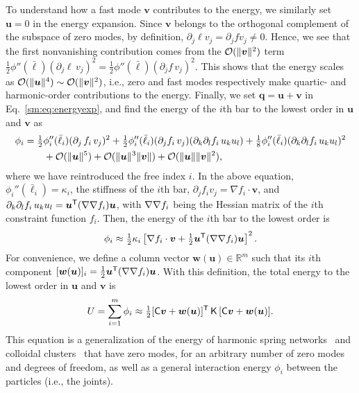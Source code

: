 To understand how a fast mode $\bm{v}$ contributes to the energy, we similarly set $\bm{u} = 0$ in the energy expansion.
Since $\bm{v}$ belongs to the orthogonal complement of the subspace of zero modes, by definition, $\partial_j \ell v_j = \partial_j f v_j \ne 0$.
Hence, we see that the first nonvanishing contribution comes from the $\mathcal{O}(\lVert\bm{v}\rVert^2)$ term $\tfrac{1}{2}\phi''(\bar{\ell})(\partial_j \ell\, v_j)^2 = \tfrac{1}{2}\phi''(\bar{\ell})(\partial_j f\, v_j)^2$.
This shows that the energy scales as $\mathcal{O}(\lVert\bm{u}\rVert^4) \sim \mathcal{O}(\lVert\bm{v}\rVert^2)$, i.e., zero and fast modes respectively make quartic- and harmonic-order contributions to the energy.
Finally, we set $\bm{q} = \bm{u} + \bm{v}$ in Eq.~\eqref{sm:eq:energyexp}, and find the energy of the $i$th bar to the lowest order in $\bm{u}$ and $\bm{v}$ as
%
\begin{equation}
  \begin{aligned}
    \phi_i &= \tfrac{1}{2}\phi_i''(\bar{\ell}_i)(\partial_j\, f_i\, v_j)^2 + \tfrac{1}{2}\phi''_i(\bar{\ell}_i)(\partial_j f_i\, v_j)(\partial_k \partial_l f_i\, u_k u_l) + \tfrac{1}{8}\phi''_i(\bar{\ell}_i)(\partial_k \partial_l f_i\, u_k u_l)^2\\
           &\qquad+ \mathcal{O}(\lVert\bm{u}\rVert^5) + \mathcal{O}(\lVert\bm{u}\rVert^{3}\lVert\bm{v}\rVert) +\mathcal{O}(\lVert\bm{u}\rVert\lVert\bm{v}\rVert^{2}),
  \end{aligned}
\end{equation}
%
where we have reintroduced the free index $i$.
In the above equation, $\phi_{i}''(\bar{\ell}_i) = \kappa_i$, the stiffness of the $i$th bar, $\partial_j f_i v_j = \nabla f_i\cdot\bm{v}$, and $\partial_k\partial_l f_i\, u_k u_l = \bm{u}^\mathsf{T}(\nabla\nabla f_i)\bm{u}$, with $\nabla\nabla f_i$ being the Hessian matrix of the $i$th constraint function $f_i$.
Then, the energy of the $i$th bar to the lowest order is
%
\begin{equation}
  \phi_i \approx \tfrac{1}{2}\kappa_i \left[\nabla f_i\cdot\bm{v} + \tfrac{1}{2}\bm{u}^\mathsf{T}(\nabla\nabla f_i)\bm{u}\right]^2.
\end{equation}
%
For convenience, we define a column vector $\bm{w}(\bm{u}) \in \mathbb{R}^{m}$ such that its $i$th component $[\bm{w}(\bm{u})]_{i} = \tfrac{1}{2}\bm{u}^\mathsf{T}(\nabla\nabla f_{i})\bm{u}$.
With this definition, the total energy to the lowest order in $\bm{u}$ and $\bm{v}$ is
%
\begin{equation}
  U = \sum_{i=1}^m \phi_i \approx \tfrac{1}{2} [\mathsf{C}\bm{v} + \bm{w}(\bm{u})]^\mathsf{T}\,\mathsf{K}\,[\mathsf{C}\bm{v} + \bm{w}(\bm{u})].
  \label{eq:energy_singular}
\end{equation}
%
This equation is a generalization of the energy of harmonic spring networks~\cite{zhang2016,woodhouse2018} and colloidal clusters~\cite{kallus2017} that have zero modes, for an arbitrary number of zero modes and degrees of freedom, as well as a general interaction energy $\phi_{i}$ between the particles (i.e., the joints).

